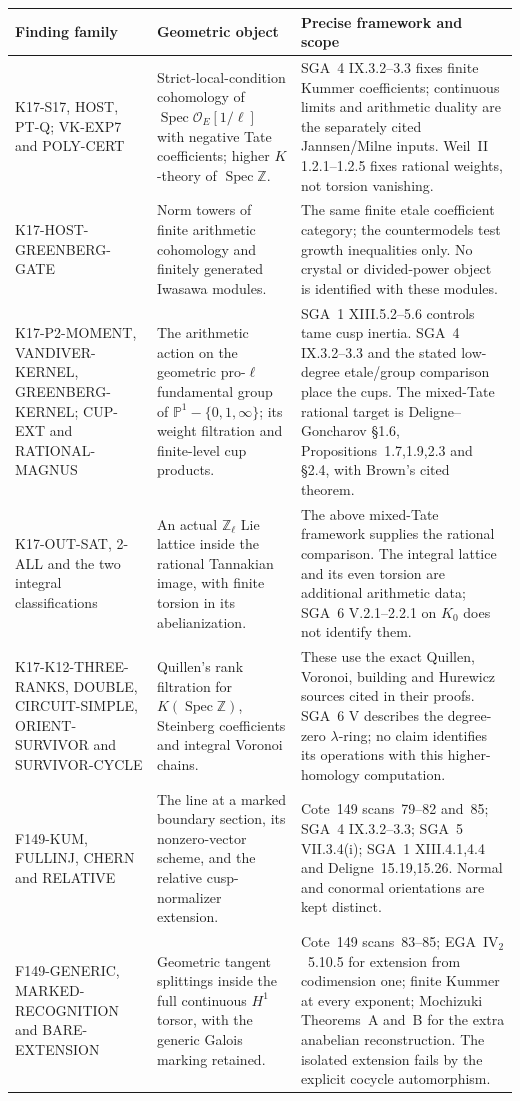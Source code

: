 \documentclass[11pt,a4paper]{article}
\theoremstyle{definition}
\begin{document}
\small
\begin{longtable}{p{}p{}p{}}
\toprule
Finding family & Geometric object & Precise framework and scope\\
\midrule
\endhead
K17-S17, HOST, PT-Q; VK-EXP7 and POLY-CERT &
Strict-local-condition cohomology of
$\operatorname{Spec}\mathcal O_E[1/\ell]$ with negative Tate
coefficients; higher $K$-theory of $\operatorname{Spec}\mathbb Z$. &
SGA~4 IX.3.2--3.3 fixes finite Kummer coefficients; continuous limits
and arithmetic duality are the separately cited Jannsen/Milne inputs.
Weil~II 1.2.1--1.2.5 fixes rational weights, not torsion vanishing.\\
K17-HOST-GREENBERG-GATE &
Norm towers of finite arithmetic cohomology and finitely generated
Iwasawa modules. &
The same finite etale coefficient category; the countermodels test
growth inequalities only. No crystal or divided-power object is
identified with these modules.\\
K17-P2-MOMENT, VANDIVER-KERNEL, GREENBERG-KERNEL;
CUP-EXT and RATIONAL-MAGNUS &
The arithmetic action on the geometric pro-$\ell$ fundamental group
of $\mathbb P^1-\{0,1,\infty\}$; its weight filtration and
finite-level cup products. &
SGA~1 XIII.5.2--5.6 controls tame cusp inertia. SGA~4 IX.3.2--3.3
and the stated low-degree etale/group comparison place the cups.
The mixed-Tate rational target is Deligne--Goncharov \S1.6,
Propositions~1.7,1.9,2.3 and \S2.4, with Brown's cited theorem.\\
K17-OUT-SAT, 2-ALL and the two integral classifications &
An actual $\mathbb Z_\ell$ Lie lattice inside the rational
Tannakian image, with finite torsion in its abelianization. &
The above mixed-Tate framework supplies the rational comparison.
The integral lattice and its even torsion are additional arithmetic
data; SGA~6 V.2.1--2.2.1 on $K_0$ does not identify them.\\
K17-K12-THREE-RANKS, DOUBLE, CIRCUIT-SIMPLE,
ORIENT-SURVIVOR and SURVIVOR-CYCLE &
Quillen's rank filtration for $K(\operatorname{Spec}\mathbb Z)$,
Steinberg coefficients and integral Voronoi chains. &
These use the exact Quillen, Voronoi, building and Hurewicz sources
cited in their proofs. SGA~6 V describes the degree-zero
$\lambda$-ring; no claim identifies its operations with this
higher-homology computation.\\
F149-KUM, FULLINJ, CHERN and RELATIVE &
The line at a marked boundary section, its nonzero-vector scheme,
and the relative cusp-normalizer extension. &
Cote~149 scans~79--82 and~85; SGA~4 IX.3.2--3.3;
SGA~5 VII.3.4(i); SGA~1 XIII.4.1,4.4 and Deligne~15.19,15.26.
Normal and conormal orientations are kept distinct.\\
F149-GENERIC, MARKED-RECOGNITION and BARE-EXTENSION &
Geometric tangent splittings inside the full continuous
$H^1$ torsor, with the generic Galois marking retained. &
Cote~149 scans~83--85; EGA~$\mathrm{IV}_2$~5.10.5 for extension
from codimension one; finite Kummer at every exponent;
Mochizuki Theorems~A and~B for the extra anabelian reconstruction.
The isolated extension fails by the explicit cocycle automorphism.\\
\bottomrule
\end{longtable}
\end{document}

